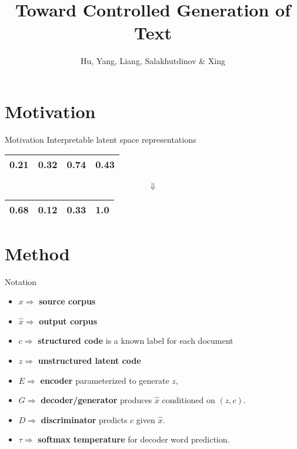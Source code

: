 \documentclass{beamer}
\title{Toward Controlled Generation of Text}
\date{}
\author{Hu, Yang, Liang, Salakhutdinov \& Xing}
\institute{ICML 2017}
\begin{document}
  \maketitle

    \section{Motivation}
    \begin{frame}{Motivation}
      Interpretable latent space representations
      \begin{center}
        \begin{tabular}{ | c | c | c | c | }
          \hline
          0.21 & 0.32 & 0.74 & 0.43 \\  
          \hline
        \end{tabular}
      \end{center}
      {\Huge$$\Downarrow$$}
      \begin{center}
        \begin{tabular}{ | c | c | c | c | }
          \hline
          0.68 & 0.12 & 0.33 & {\color{red}\textbf{1.0}} \\  
          \hline
        \end{tabular}
      \end{center}
    \end{frame}

  \section{Method}
  \begin{frame}{Notation}
    \begin{itemize}
      \item $x \Rightarrow$ \textbf{source corpus}
      \item $\hat{x} \Rightarrow$ \textbf{output corpus}
      \item $c \Rightarrow$ \textbf{structured code} is a known label for each document
      \item $z \Rightarrow$ \textbf{unstructured latent code}
      \item $E \Rightarrow$ \textbf{encoder} parameterized to generate $z$, 
      \item $G \Rightarrow$ \textbf{decoder/generator} produces $\hat{x}$ conditioned on $(z, c)$.
      \item $D \Rightarrow$ \textbf{discriminator} predicts $c$ given $\hat{x}$.
      \item $\tau \Rightarrow$ \textbf{softmax temperature} for decoder word prediction.
    \end{itemize}
  \end{frame}
\end{document}
